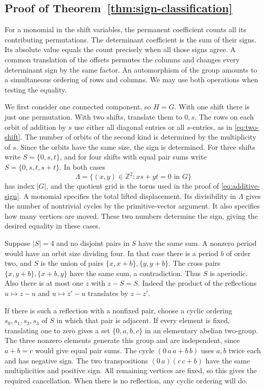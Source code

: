 \documentclass[11pt,reqno]{amsart}
\theoremstyle{remark}
\numberwithin{equation}{section}
\begin{document}
\subsection{Proof of Theorem~\ref{thm:sign-classification}}

For a monomial in the shift variables, the permanent coefficient counts
all its contributing permutations. The determinant coefficient is the sum
of their signs. Its absolute value equals the count precisely when all
those signs agree. A common translation of the offsets permutes the
columns and changes every determinant sign by the same factor. An
automorphism of the group amounts to a simultaneous ordering of rows and
columns. We may use both operations when testing the equality.

We first consider one connected component, so \(H=G\). With one shift
there is just one permutation. With two shifts, translate them to
\(0,s\). The rows on each orbit of addition by \(s\) use either all
diagonal entries or all \(s\)-entries, as in \eqref{eq:two-shift}. The
number of orbits of the second kind is determined by the multiplicity of
\(s\). Since the orbits have the same size, the sign is determined. For
three shifts write \(S=\{0,s,t\}\), and for four shifts with equal pair
sums write \(S=\{0,s,t,s+t\}\). In both cases
\[
 \Lambda=\{(x,y)\in\mathbb Z^2:xs+yt=0\text{ in }G\}
\]
has index \(|G|\), and the quotient grid is the torus used in the proof
of \eqref{eq:additive-sign}. A monomial specifies the total lifted
displacement. Its divisibility in \(\Lambda\) gives the number of
nontrivial cycles by the primitive-vector argument. It also specifies how
many vertices are moved. These two numbers determine the sign, giving the
desired equality in these cases.

Suppose \(|S|=4\) and no disjoint pairs in \(S\) have the same sum. A
nonzero period would have an orbit size dividing four. In that case there
is a period \(b\) of order two, and \(S\) is the union of pairs
\(\{x,x+b\},\{y,y+b\}\). The cross pairs \(\{x,y+b\},\{x+b,y\}\) have the
same sum, a contradiction. Thus \(S\) is aperiodic. Also there is at most
one \(z\) with \(z-S=S\). Indeed the product of the reflections
\(u\mapsto z-u\) and \(u\mapsto z'-u\) translates by \(z-z'\).

If there is such a reflection with a nonfixed pair, choose a cyclic
ordering \(s_0,s_1,s_2,s_3\) of \(S\) in which that pair is adjacent. If
every element is fixed, translating one to zero gives a set
\(\{0,a,b,c\}\) in an elementary abelian two-group. The three nonzero
elements generate this group and are independent, since \(a+b=c\) would
give equal pair sums. The cycle \((0\,a\,a+b\,b)\) uses \(a,b\) twice
each and has negative sign. The two transpositions \((0\,a)(c\,c+b)\)
have the same multiplicities and positive sign. All remaining vertices
are fixed, so this gives the required cancellation. When there is no
reflection, any cyclic ordering will do.
\end{document}
